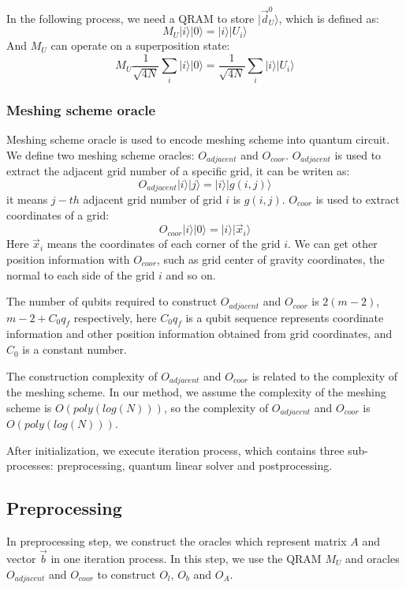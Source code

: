 \documentclass[%
 reprint,
 amsmath,amssymb,
pra,
]{revtex4-1}
\begin{document}
\begin{itemize}
In the following process, we need a QRAM to store $|\vec{d}_U^0\rangle$, which is defined as:
$$
M_U|i\rangle|0\rangle=|i\rangle|U_i\rangle
$$
And $M_U$ can operate on a superposition state:
$$
M_U\frac{1}{\sqrt{4N}}\sum_i{|i\rangle|0\rangle}=\frac{1}{\sqrt{4N}}\sum_i{|i\rangle|U_i\rangle}
$$

\subsubsection{Meshing scheme oracle}

Meshing scheme oracle is used to encode meshing scheme into quantum circuit. We define two meshing scheme oracles: $O_{adjacent}$ and $O_{coor}$. $O_{adjacent}$ is used to extract the adjacent grid number of a specific grid, it can be writen as:
$$
O_{adjacent}|i\rangle|j\rangle=|i\rangle|g(i,j)\rangle
$$
it means $j-th$ adjacent grid number of grid $i$ is $g(i,j)$. $O_{coor}$ is used to extract coordinates of a grid:
$$
O_{coor}|i\rangle|0\rangle=|i\rangle|\vec{x}_i\rangle
$$
Here $\vec{x}_i$ means the coordinates of each corner of the grid $i$. We can get other position information with $O_{coor}$, such as grid center of gravity coordinates, the normal to each side of the grid $i$ and so on.

The number of qubits required to construct $O_{adjacent}$ and $O_{coor}$ is $2(m-2)$, $m-2+C_0q_f$ respectively, here $C_0q_f$ is a qubit sequence represents coordinate information and other position information obtained from grid coordinates, and $C_0$ is a constant number.

The construction complexity of $O_{adjacent}$ and $O_{coor}$ is related to the complexity of the meshing scheme. In our method, we assume the complexity of the meshing scheme is $O(poly(log(N)))$, so the complexity of $O_{adjacent}$ and $O_{coor}$ is $O(poly(log(N)))$. 

After initialization, we execute iteration process, which contains three sub-processes: preprocessing, quantum linear solver and postprocessing.

\subsection{Preprocessing}

In preprocessing step, we construct the oracles which represent matrix $A$ and vector $\vec{b}$ in one iteration process. In this step, we use the QRAM $M_U$ and oracles $O_{adjacent}$ and $O_{coor}$ to construct $O_l$, $O_b$ and $O_A$. 


\end{itemize}
\end{document}
